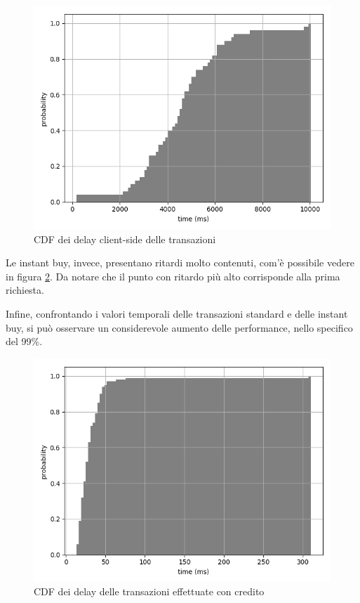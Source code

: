 \begin{figure}[h!t]
\centerline{\includegraphics[width=\textwidth]{img/client-side-delay-grey}}
\caption{CDF dei delay client-side delle transazioni}
\label{f:calcoli:client}
\end{figure}

Le instant buy, invece, presentano ritardi molto contenuti, com'è possibile vedere in figura \ref{f:calcoli:instant}. Da notare che il punto con ritardo più alto corrisponde alla prima richiesta.

Infine, confrontando i valori temporali delle transazioni standard e delle instant buy, si può osservare un considerevole aumento delle performance, nello specifico del 99\%.

\begin{figure}[h!t]
\centerline{\includegraphics[width=\textwidth]{img/instant-buy-delay-grey}}
\caption{CDF dei delay delle transazioni effettuate con credito}
\label{f:calcoli:instant}
\end{figure}

